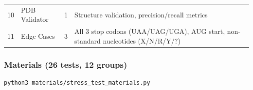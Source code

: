 \documentclass[12pt,a4paper]{article}
\begin{document}
\begin{longtable}[]{@{}llll@{}}
\begin{minipage}[t]{0.09\columnwidth}
10\strut
\end{minipage} & \begin{minipage}[t]{0.31\columnwidth}\raggedright
PDB Validator\strut
\end{minipage} & \begin{minipage}[t]{0.20\columnwidth}\raggedright
1\strut
\end{minipage} & \begin{minipage}[t]{0.29\columnwidth}\raggedright
Structure validation, precision/recall metrics\strut
\end{minipage}\tabularnewline
\begin{minipage}[t]{0.09\columnwidth}\raggedright
11\strut
\end{minipage} & \begin{minipage}[t]{0.31\columnwidth}\raggedright
Edge Cases\strut
\end{minipage} & \begin{minipage}[t]{0.20\columnwidth}\raggedright
3\strut
\end{minipage} & \begin{minipage}[t]{0.29\columnwidth}\raggedright
All 3 stop codons (UAA/UAG/UGA), AUG start, non-standard nucleotides
(X/N/R/Y/?)\strut
\end{minipage}\tabularnewline
\bottomrule
\end{longtable}

\hypertarget{materials-26-tests-12-groups}{%
\subsubsection{Materials (26 tests, 12
groups)}\label{materials-26-tests-12-groups}}

\begin{verbatim}
python3 materials/stress_test_materials.py
\end{verbatim}
\end{document}
